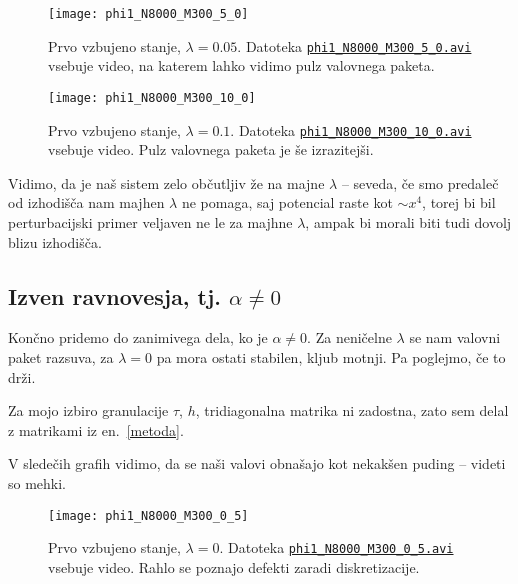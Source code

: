 \documentclass[a4 paper, 12pt]{article}
\begin{document}
\begin{figure}[H]
	\centering
	\texttt{[image: phi1\_N8000\_M300\_5\_0]}
	\vspace{-20pt}
	\caption{Prvo vzbujeno stanje, $\lambda=0.05$. Datoteka
		\href{phi1_N8000_M300_5_0.avi}{{\tt phi1\_N8000\_M300\_5\_0.avi}}
		vsebuje video, na katerem lahko vidimo pulz valovnega paketa.}
	\label{fig5}
	\vspace{-10pt}
\end{figure}

\begin{figure}[H]
	\centering
	\texttt{[image: phi1\_N8000\_M300\_10\_0]}
	\vspace{-20pt}
	\caption{Prvo vzbujeno stanje, $\lambda=0.1$. Datoteka
		\href{phi1_N8000_M300_10_0.avi}{{\tt phi1\_N8000\_M300\_10\_0.avi}}
		vsebuje video. Pulz valovnega paketa je še izrazitejši.}
	\label{fig6}
	\vspace{-10pt}
\end{figure}

Vidimo, da je naš sistem zelo občutljiv že na majne $\lambda$ -- seveda, če smo predaleč od
izhodišča nam majhen $\lambda$ ne pomaga, saj potencial raste kot $\sim x^4$, torej bi bil
perturbacijski primer veljaven ne le za majhne $\lambda$, ampak bi morali biti tudi dovolj
blizu izhodišča.

\subsection{Izven ravnovesja, tj. $\alpha \neq 0$}

Končno pridemo do zanimivega dela, ko je $\alpha \neq 0$. Za neničelne $\lambda$ se nam valovni
paket razsuva, za $\lambda = 0$ pa mora ostati stabilen, kljub motnji. Pa poglejmo, če to drži.

Za mojo izbiro granulacije $\tau$, $h$, tridiagonalna matrika ni zadostna, zato sem delal z
matrikami iz en.~\eqref{metoda}.

V sledečih grafih vidimo, da se naši valovi obnašajo kot nekakšen puding -- videti so mehki.

\begin{figure}[H]
	\centering
	\texttt{[image: phi1\_N8000\_M300\_0\_5]}
	\vspace{-20pt}
	\caption{Prvo vzbujeno stanje, $\lambda=0$. Datoteka
		\href{phi1_N8000_M300_0_5.avi}{{\tt phi1\_N8000\_M300\_0\_5.avi}}
		vsebuje video. Rahlo se poznajo defekti zaradi diskretizacije.}
	\label{fig7}
	\vspace{-10pt}
\end{figure}
\end{document}
